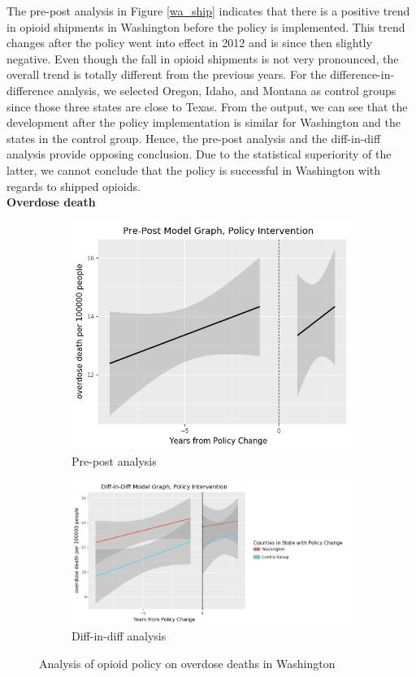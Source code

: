 \documentclass[12pt,letterpaper]{article}
\begin{document}
The pre-post analysis in Figure \ref{wa_ship} indicates that there is a positive trend in opioid shipments in Washington before the policy is implemented. This trend changes after the policy went into effect in 2012 and is since then slightly negative. Even though the fall in opioid shipments is not very pronounced, the overall trend is totally different from the previous years. For the difference-in-difference analysis, we selected Oregon, Idaho, and Montana as control groups since those three states are close to Texas. From the output, we can see that the development after the policy implementation is similar for Washington and the states in the control group. Hence, the pre-post analysis and the diff-in-diff analysis provide opposing conclusion. Due to the statistical superiority of the latter, we cannot conclude that the policy is successful in Washington with regards to shipped opioids. \\

\noindent \textbf{Overdose death}

\begin{figure}[!h]
\centering
\begin{subfigure}{.5\textwidth}
  \centering
  \includegraphics[width=0.7\linewidth]{../30_results/General_Results/washington_overdose_death_prepost.png}
  \caption{Pre-post analysis}
  \label{fig:wa_death_prepost}
\end{subfigure}%
\begin{subfigure}{.55\textwidth}
  \centering
  \includegraphics[width=1\linewidth]{../30_results/General_Results/washington_overdose_death_diffdiff.png}
  \caption{Diff-in-diff analysis}
  \label{fig:wa_death_did}
\end{subfigure}
\caption{Analysis of opioid policy on overdose deaths in Washington}
\label{fig:wa_death}
\end{figure}
\end{document}
